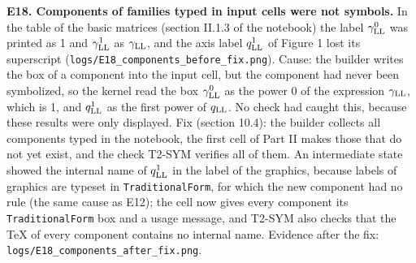 \documentclass[
  10pt,
]{article}
\begin{document}
\textbf{E18. Components of families typed in input cells were not
symbols.} In the table of the basic matrices (section II.1.3 of the
notebook) the label \(\gamma^0_{\rm LL}\) was printed as 1 and
\(\gamma^1_{\rm LL}\) as \(\gamma_{\rm LL}\), and the axis label
\(q^1_{\rm LL}\) of Figure 1 lost its superscript
(\texttt{logs/E18\_components\_before\_fix.png}). Cause: the builder
writes the box of a component into the input cell, but the component had
never been symbolized, so the kernel read the box \(\gamma^0_{\rm LL}\)
as the power 0 of the expression \(\gamma_{\rm LL}\), which is 1, and
\(q^1_{\rm LL}\) as the first power of \(q_{\rm LL}\). No check had
caught this, because these results were only displayed. Fix (section
10.4): the builder collects all components typed in the notebook, the
first cell of Part II makes those that do not yet exist, and the check
T2-SYM verifies all of them. An intermediate state showed the internal
name of \(q^1_{\rm LL}\) in the label of the graphics, because labels of
graphics are typeset in \texttt{TraditionalForm}, for which the new
component had no rule (the same cause as E12); the cell now gives every
component its \texttt{TraditionalForm} box and a usage message, and
T2-SYM also checks that the TeX of every component contains no internal
name. Evidence after the fix:
\texttt{logs/E18\_components\_after\_fix.png}.
\end{document}
